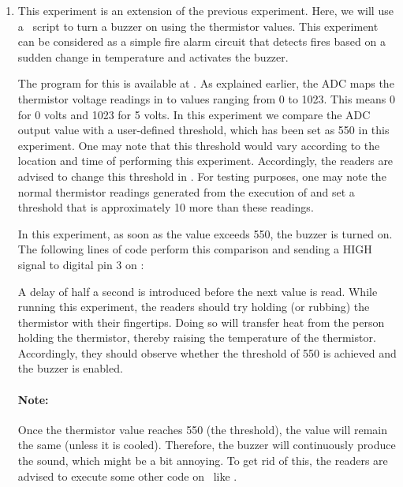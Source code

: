 \begin{enumerate}
  \item This experiment is an extension of the previous
        experiment. Here, we will use a \scilab\ script to
        turn a buzzer on using the thermistor values. This experiment
        can be considered as a simple fire alarm circuit that
        detects fires based on a sudden change in temperature and
        activates the buzzer.

        The program for this is available at
        .  As explained earlier,
        the ADC maps the thermistor voltage readings in to values
        ranging from 0 to 1023. This means 0 for 0 volts and 1023 for 5
        volts. In this experiment we compare the ADC output value with a user-defined
        threshold, which has been set as 550 in this experiment. One may note that
        this threshold would vary according to the location and time of performing
        this experiment. Accordingly, the readers are advised to change this threshold
        in . For testing purposes, one may note the
        normal thermistor readings generated from the execution of 
        and set a threshold that is approximately 10 more than these readings.

        In this experiment, as soon as the value exceeds 550, the buzzer is turned on. The following lines of code perform this
        comparison and sending a {HIGH} signal to digital pin 3 on \arduino:
        
        A delay of half a second is introduced
        before the next value is read. While running this experiment,
        the readers should try holding (or rubbing) the thermistor with their fingertips.
        Doing so will transfer heat from the person holding the
        thermistor, thereby raising the temperature of the thermistor.
        Accordingly, they should observe whether the threshold of 550 is achieved
        and the buzzer is enabled.

        \paragraph{Note:} Once the thermistor value reaches 550 (the threshold), the value will remain the same
        (unless it is cooled). Therefore, the buzzer will continuously produce the sound, which might be
        a bit annoying. To get rid of this, the readers are advised to
        execute some other code on \arduino\ like .
\end{enumerate}


